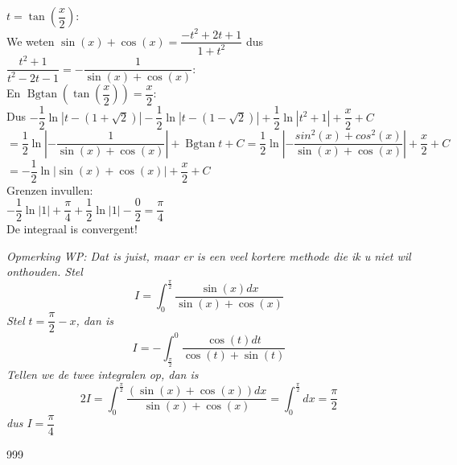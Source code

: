 \documentclass[a4paper]{article}
\newcommand{\dint}{\displaystyle\int}
\begin{document}
$t = \tan\left(\dfrac{x}{2}\right)$:\\

We weten $\sin(x)+\cos(x) = \dfrac{-t^2+2t+1}{1+t^2}$ dus $\dfrac{t^2+1}{t^2-2t-1}=-\dfrac{1}{\sin(x)+\cos(x)}$:\\

En $\operatorname{Bgtan}{\left(\tan\left(\dfrac{x}{2}\right)\right)} = \dfrac{x}{2}$:\\

Dus $-\dfrac{1}{2}\ln|t-(1+\sqrt{2})| - \dfrac{1}{2}\ln|t-(1-\sqrt{2})| + \dfrac{1}{2}\ln|t^2+1| + \dfrac{x}{2} + C$\\

$= \dfrac{1}{2}\ln\left|-\dfrac{1}{\sin(x)+\cos(x)}\right| + \operatorname{Bgtan}{t} + C = \dfrac{1}{2}\ln\left|-\dfrac{sin^2(x)+cos^2(x)}{\sin(x)+\cos(x)}\right| + \dfrac{x}{2} + C$\\

$= -\dfrac{1}{2}\ln|\sin(x)+\cos(x)| + \dfrac{x}{2} + C$\\

Grenzen invullen:\\

$-\dfrac{1}{2}\ln|1| + \dfrac{\pi}{4} + \dfrac{1}{2}\ln|1| - \dfrac{0}{2} = \dfrac{\pi}{4}$\\

De integraal is convergent!\\

\bigskip

\emph{Opmerking WP: Dat is juist, maar er is een veel kortere methode die ik u niet wil onthouden. Stel
$$I = \dint_{0}^{\tfrac{\pi}{2}} \dfrac{\sin(x)dx}{\sin(x)+\cos(x)}$$
Stel $t=\dfrac{\pi}{2}-x$, dan is
$$I = -\dint_{\tfrac{\pi}{2}}^0 \dfrac{\cos(t)dt}{\cos(t)+\sin(t)}$$
Tellen we de twee integralen op, dan is 
$$2I = \dint_{0}^{\tfrac{\pi}{2}} \dfrac{(\sin(x)+\cos(x))dx}{\sin(x)+\cos(x)} = \dint_{0}^{\tfrac{\pi}{2}} dx = \dfrac{\pi}{2}$$
dus $I=\dfrac{\pi}{4}$}

\begin{thebibliography}{999}
\end{thebibliography}
\end{document}
